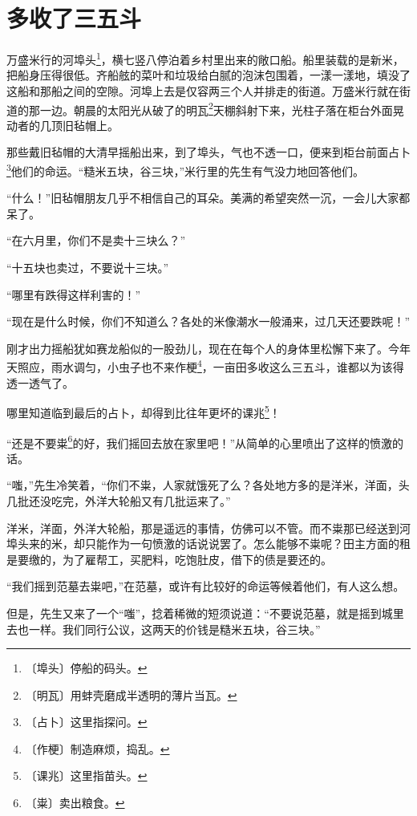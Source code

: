 \documentclass[12pt,UTF-8,openany]{ctexbook}
\begin{document}
\chapter{多收了三五斗}

\begin{normalsize}
    
    万盛米行的河埠头\footnote{〔埠头〕停船的码头。}，横七竖八停泊着乡村里出来的敞口船。船里装载的是新米，把船身压得很低。齐船舷的菜叶和垃圾给白腻的泡沫包围着，一漾一漾地，填没了这船和那船之间的空隙。河埠上去是仅容两三个人并排走的街道。万盛米行就在街道的那一边。朝晨的太阳光从破了的明瓦\footnote{〔明瓦〕用蚌壳磨成半透明的薄片当瓦。}天棚斜射下来，光柱子落在柜台外面晃动者的几顶旧毡帽上。
    
    那些戴旧毡帽的大清早摇船出来，到了埠头，气也不透一口，便来到柜台前面占卜\footnote{〔占卜〕这里指探问。}他们的命运。“糙米五块，谷三块，”米行里的先生有气没力地回答他们。
    
    “什么！”旧毡帽朋友几乎不相信自己的耳朵。美满的希望突然一沉，一会儿大家都呆了。
    
    “在六月里，你们不是卖十三块么？”
    
    “十五块也卖过，不要说十三块。”
    
    “哪里有跌得这样利害的！”
    
    “现在是什么时候，你们不知道么？各处的米像潮水一般涌来，过几天还要跌呢！”
    
    刚才出力摇船犹如赛龙船似的一股劲儿，现在在每个人的身体里松懈下来了。今年天照应，雨水调匀，小虫子也不来作梗\footnote{〔作梗〕制造麻烦，捣乱。}，一亩田多收这么三五斗，谁都以为该得透一透气了。
    
    哪里知道临到最后的占卜，却得到比往年更坏的课兆\footnote{〔课兆〕这里指苗头。}！
    
    “还是不要粜\footnote{〔粜〕卖出粮食。}的好，我们摇回去放在家里吧！”从简单的心里喷出了这样的愤激的话。
    
    “嗤，”先生冷笑着，“你们不粜，人家就饿死了么？各处地方多的是洋米，洋面，头几批还没吃完，外洋大轮船又有几批运来了。”
    
    洋米，洋面，外洋大轮船，那是遥远的事情，仿佛可以不管。而不粜那已经送到河埠头来的米，却只能作为一句愤激的话说说罢了。怎么能够不粜呢？田主方面的租是要缴的，为了雇帮工，买肥料，吃饱肚皮，借下的债是要还的。
    
    “我们摇到范墓去粜吧，”在范墓，或许有比较好的命运等候着他们，有人这么想。
    
    但是，先生又来了一个“嗤”，捻着稀微的短须说道：“不要说范墓，就是摇到城里去也一样。我们同行公议，这两天的价钱是糙米五块，谷三块。”
    

\end{normalsize}
\end{document}
